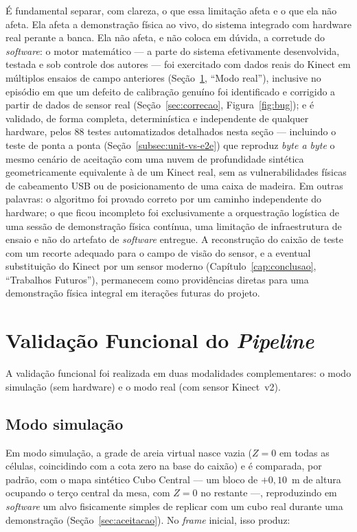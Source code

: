 \noindent É fundamental separar, com clareza, o que essa limitação
afeta e o que ela não afeta. Ela afeta a demonstração física ao vivo,
do sistema integrado com hardware real perante a banca. Ela não afeta,
e não coloca em dúvida, a corretude do \textit{software}: o motor matemático — a parte do
sistema efetivamente desenvolvida, testada e sob controle dos autores
— foi exercitado com dados reais do Kinect em múltiplos ensaios de
campo anteriores (Seção~\ref{sec:funcional}, ``Modo real''), inclusive
no episódio em que um defeito de calibração genuíno foi identificado e
corrigido a partir de dados de sensor real (Seção~\ref{sec:correcao},
Figura~\ref{fig:bug}); e é validado, de forma completa, determinística
e independente de qualquer hardware, pelos 88 testes automatizados
detalhados nesta seção — incluindo o teste de ponta a ponta
(Seção~\ref{subsec:unit-vs-e2e}) que reproduz \emph{byte a byte} o
mesmo cenário de aceitação com uma nuvem de profundidade sintética
geometricamente equivalente à de um Kinect real, sem as
vulnerabilidades físicas de cabeamento USB ou de posicionamento de
uma caixa de madeira. Em outras palavras: o algoritmo foi provado
correto por um caminho independente do hardware; o que ficou
incompleto foi exclusivamente a orquestração logística de uma sessão
de demonstração física contínua, uma limitação de infraestrutura de
ensaio e não do artefato de \textit{software} entregue. A reconstrução
do caixão de teste com um recorte adequado para o campo de visão do
sensor, e a eventual substituição do Kinect por um sensor moderno
(Capítulo~\ref{cap:conclusao}, ``Trabalhos Futuros''), permanecem como
providências diretas para uma demonstração física integral em
iterações futuras do projeto.

\section{Validação Funcional do \textit{Pipeline}}
\label{sec:funcional}

A validação funcional foi realizada em duas modalidades complementares:
o modo simulação (sem hardware) e o modo real (com sensor Kinect~v2).

\subsection{Modo simulação}

Em modo simulação, a grade de areia virtual nasce vazia
($Z = 0$ em todas as células, coincidindo com a cota zero na base do
caixão) e é comparada, por padrão, com o mapa sintético
Cubo Central — um bloco de $+0{,}10$~m de altura ocupando o
terço central da mesa, com $Z = 0$ no restante —, reproduzindo em
\textit{software} um alvo fisicamente simples de replicar com um cubo
real durante uma demonstração (Seção~\ref{sec:aceitacao}). No
\textit{frame} inicial, isso produz:

